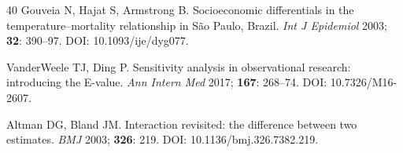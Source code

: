 \documentclass[review,number]{elsarticle}
\begin{document}
\begin{thebibliography}{40}
Gouveia N, Hajat S, Armstrong B.
Socioeconomic differentials in the temperature--mortality relationship in S\~{a}o Paulo, Brazil.
\textit{Int J Epidemiol} 2003; \textbf{32}: 390--97.
DOI: 10.1093/ije/dyg077.

VanderWeele TJ, Ding P.
Sensitivity analysis in observational research: introducing the E-value.
\textit{Ann Intern Med} 2017; \textbf{167}: 268--74.
DOI: 10.7326/M16-2607.

Altman DG, Bland JM.
Interaction revisited: the difference between two estimates.
\textit{BMJ} 2003; \textbf{326}: 219.
DOI: 10.1136/bmj.326.7382.219.

\end{thebibliography}
\end{document}
